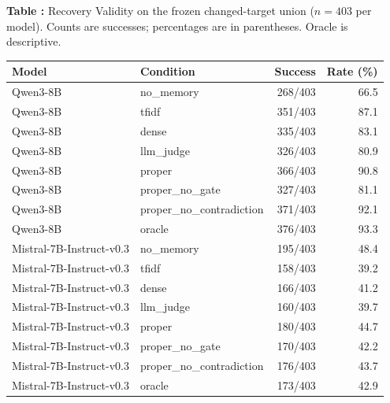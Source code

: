 \begin{center}
\label{tab:main-results}
\textbf{Table \thetable:} Recovery Validity on the frozen changed-target union ($n=403$ per model). Counts are successes; percentages are in parentheses. Oracle is descriptive.\par\smallskip
\small
\begin{tabular}{llrr}
\toprule
Model & Condition & Success & Rate (\%) \\
\midrule
Qwen3-8B & no\_memory & 268/403 & 66.5 \\
Qwen3-8B & tfidf & 351/403 & 87.1 \\
Qwen3-8B & dense & 335/403 & 83.1 \\
Qwen3-8B & llm\_judge & 326/403 & 80.9 \\
Qwen3-8B & proper & 366/403 & 90.8 \\
Qwen3-8B & proper\_no\_gate & 327/403 & 81.1 \\
Qwen3-8B & proper\_no\_contradiction & 371/403 & 92.1 \\
Qwen3-8B & oracle & 376/403 & 93.3 \\
\midrule
Mistral-7B-Instruct-v0.3 & no\_memory & 195/403 & 48.4 \\
Mistral-7B-Instruct-v0.3 & tfidf & 158/403 & 39.2 \\
Mistral-7B-Instruct-v0.3 & dense & 166/403 & 41.2 \\
Mistral-7B-Instruct-v0.3 & llm\_judge & 160/403 & 39.7 \\
Mistral-7B-Instruct-v0.3 & proper & 180/403 & 44.7 \\
Mistral-7B-Instruct-v0.3 & proper\_no\_gate & 170/403 & 42.2 \\
Mistral-7B-Instruct-v0.3 & proper\_no\_contradiction & 176/403 & 43.7 \\
Mistral-7B-Instruct-v0.3 & oracle & 173/403 & 42.9 \\
\bottomrule
\end{tabular}
\end{center}
